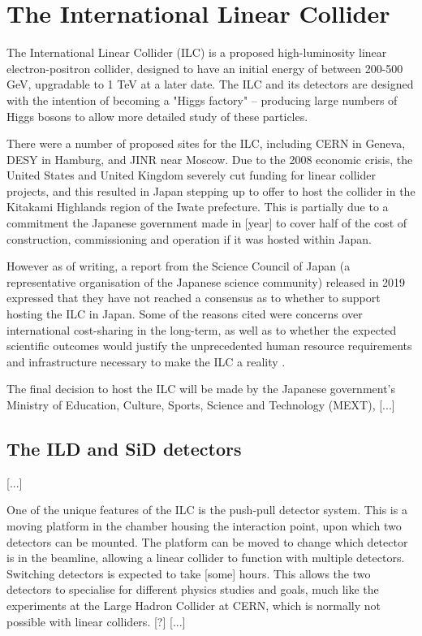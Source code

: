 \section{The International Linear Collider}

The International Linear Collider (ILC) is a proposed high-luminosity linear electron-positron collider, designed to have an initial energy of between 200-500 GeV, upgradable to 1 TeV at a later date. The ILC and its detectors are designed with the intention of becoming a "Higgs factory" -- producing large numbers of Higgs bosons to allow more detailed study of these particles.

There were a number of proposed sites for the ILC, including CERN in Geneva, DESY in Hamburg, and JINR near Moscow. Due to the 2008 economic crisis, the United States and United Kingdom severely cut funding for linear collider projects, and this resulted in Japan stepping up to offer to host the collider in the Kitakami Highlands region of the Iwate prefecture. This is partially due to a commitment the Japanese government made in [year] to cover half of the cost of construction, commissioning and operation if it was hosted within Japan.

However as of writing, a report from the Science Council of Japan (a representative organisation of the Japanese science community) released in 2019 expressed that they have not reached a consensus as to whether to support hosting the ILC in Japan. Some  of the reasons cited were concerns over international cost-sharing in the long-term, as well as to whether the expected scientific outcomes would justify the unprecedented human resource requirements and infrastructure necessary to make the ILC a reality \cite{linearcolliders-scj-report}.

The final decision to host the ILC will be made by the Japanese government's Ministry of Education, Culture, Sports, Science and Technology (MEXT), [...]

\subsection{The ILD and SiD detectors}
[...]

One of the unique features of the ILC is the push-pull detector system. This is a moving platform in the chamber housing the interaction point, upon which two detectors can be mounted. The platform can be moved to change which detector is in the beamline, allowing a linear collider to function with multiple detectors. Switching detectors is expected to take [some] hours. This allows the two detectors to specialise for different physics studies and goals, much like the experiments at the Large Hadron Collider at CERN, which is normally not possible with linear colliders. [?] [...]

